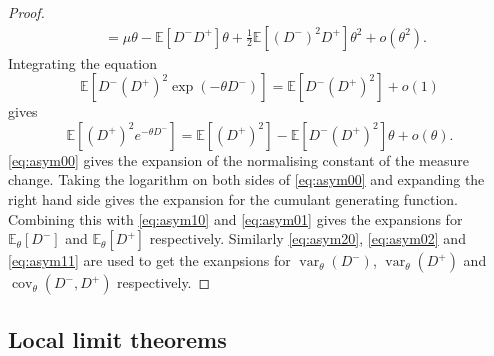 \documentclass[draft]{scrartcl}
\newcommand{\E}{\mathbb E}
\newcommand{\littleo}{o}
\DeclareMathOperator{\var}{var}
\DeclareMathOperator{\cov}{cov}
\begin{document}
\begin{proof}
\begin{align}
        &= \mu \theta - \E \left[ D^- D^+ \right] \theta + \tfrac{1}{2} \E \left[ (D^-)^2 D^+ \right] \theta^2 + \littleo(\theta^2).
        \label{eq:asym01}
    \end{align}
    Integrating the equation
    \begin{equation}
        \E \left[ D^- (D^+)^2 \exp(-\theta D^-) \right] = \E \left[ D^- (D^+)^2 \right] + \littleo(1)
    \end{equation}
    gives
    \begin{equation}
        \E \left[ (D^+)^2 e^{-\theta D^-} \right] = \E \left[ (D^+)^2 \right] - \E \left[ D^- (D^+)^2 \right] \theta + \littleo(\theta). \label{eq:asym02}
    \end{equation}
    \cref{eq:asym00} gives the expansion of the normalising constant of the measure change. Taking the logarithm on both sides of \cref{eq:asym00} and expanding the right hand side gives the expansion for the cumulant generating function. Combining this with \cref{eq:asym10} and \cref{eq:asym01} gives the expansions for $\E_{\theta}[D^-]$ and $\E_{\theta}[D^+]$ respectively. Similarly \cref{eq:asym20}, \cref{eq:asym02} and \cref{eq:asym11} are used to get the exanpsions for $\var_{\theta}(D^-)$, $\var_{\theta}(D^+)$ and $\cov_{\theta}(D^-, D^+)$ respectively.
\end{proof}

\subsection{Local limit theorems}
\end{document}
